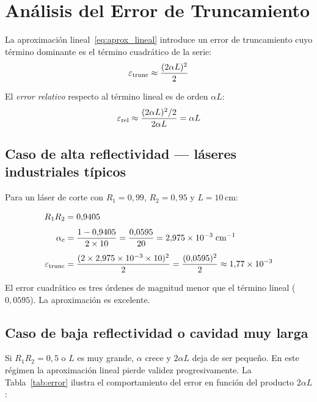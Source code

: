 \documentclass[12pt, a4paper]{article}
\begin{document}
\section{Análisis del Error de Truncamiento}

La aproximación lineal~\eqref{eq:aprox_lineal} introduce un error de truncamiento cuyo
término dominante es el término cuadrático de la serie:
%
\begin{equation}
  \varepsilon_{\rm trunc} \approx \frac{(2\alpha L)^2}{2}
  \label{eq:error}
\end{equation}

El \textit{error relativo} respecto al término lineal es de orden $\alpha L$:
%
\begin{equation}
  \varepsilon_{\rm rel} \approx \frac{(2\alpha L)^2/2}{2\alpha L} = \alpha L
\end{equation}

\subsection{Caso de alta reflectividad — láseres industriales típicos}

Para un láser de corte con $R_1 = 0{,}99$, $R_2 = 0{,}95$ y $L = 10$\,cm:

\begin{align}
  R_1 R_2 &= 0{,}9405 \\[4pt]
  \alpha_c &= \frac{1 - 0{,}9405}{2 \times 10} = \frac{0{,}0595}{20}
            = 2{,}975 \times 10^{-3}\;\text{cm}^{-1} \\[4pt]
  \varepsilon_{\rm trunc} &= \frac{(2 \times 2{,}975\times10^{-3} \times 10)^2}{2}
                           = \frac{(0{,}0595)^2}{2} \approx 1{,}77 \times 10^{-3}
\end{align}

El error cuadrático es tres órdenes de magnitud menor que el término lineal ($0{,}0595$).
La aproximación es excelente.

\subsection{Caso de baja reflectividad o cavidad muy larga}

Si $R_1 R_2 = 0{,}5$ o $L$ es muy grande, $\alpha$ crece y $2\alpha L$ deja de ser pequeño.
En este régimen la aproximación lineal pierde validez progresivamente. La
Tabla~\ref{tab:error} ilustra el comportamiento del error en función del producto
$2\alpha L$:
\end{document}
